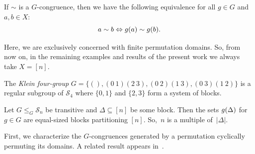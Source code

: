 If $\sim$ is a $G$-congruence, then we have the following equivalence for all $g \in G$ and $a,b \in X$:
\begin{equation}\label{eqn:G-congruence}
	a \sim b \Leftrightarrow \applyfunc{a}{g} \sim \applyfunc{b}{g}.
\end{equation}

Here, we are exclusively concerned with finite permutation domains.
So, from now on, in the remaining examples and results of the present work we always take $X = [n]$.

\begin{example}
	\label{prelim:permgrp:ex:Kleinfourgroup} 
	The \emph{Klein four-group} $G = \{ (), (0~1)(2~3), (0~2)(1~3), (0~3)(1~2) \}$
	is a regular subgroup of $\mathcal S_4$	
	where $\{0,1\}$ and $\{2,3\}$ form a system of blocks. 
\end{example} 

\begin{example}\label{prelim:ex:trans-block}
	Let $G \le_G \mathcal S_n$ be transitive and $\Delta \subseteq [n]$ be some block. 
	Then the sets $\applyfunc{\Delta}{g}$ for $g \in G$
	are equal-sized blocks partitioning $[n]$. So,~$n$ is a multiple of~$|\Delta|$.
\end{example}

First, we characterize the $G$-congruences
generated by 
a permutation cyclically permuting its domains.
A related result appears in~\cite[Lem. 2]{HeathIKS09}.

